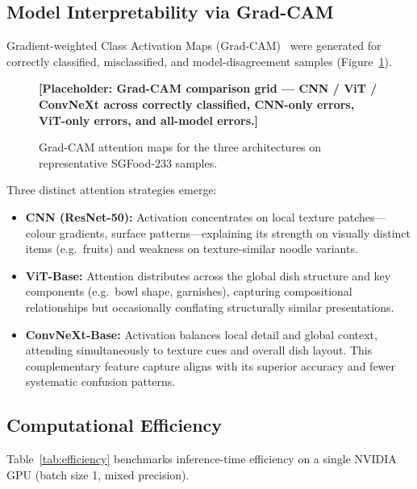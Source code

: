 \subsection{Model Interpretability via Grad-CAM}\label{sec:gradcam}

Gradient-weighted Class Activation Maps (Grad-CAM)~\cite{selvaraju2017grad}
were generated for correctly classified, misclassified, and model-disagreement
samples (Figure~\ref{fig:gradcam}).

\begin{figure}[ht]
\centering
\textbf{[Placeholder: Grad-CAM comparison grid --- CNN / ViT / ConvNeXt
across correctly classified, CNN-only errors, ViT-only errors, and
all-model errors.]}
\caption{Grad-CAM attention maps for the three architectures on
         representative SGFood-233 samples.}
\label{fig:gradcam}
\end{figure}

Three distinct attention strategies emerge:
\begin{itemize}
  \item \textbf{CNN (ResNet-50):} Activation concentrates on local
    texture patches---colour gradients, surface patterns---explaining
    its strength on visually distinct items (e.g.\ fruits) and weakness
    on texture-similar noodle variants.
  \item \textbf{ViT-Base:} Attention distributes across the global dish
    structure and key components (e.g.\ bowl shape, garnishes),
    capturing compositional relationships but occasionally conflating
    structurally similar presentations.
  \item \textbf{ConvNeXt-Base:} Activation balances local detail and
    global context, attending simultaneously to texture cues and overall
    dish layout.  This complementary feature capture aligns with its
    superior accuracy and fewer systematic confusion patterns.
\end{itemize}

\subsection{Computational Efficiency}\label{sec:efficiency}

Table~\ref{tab:efficiency} benchmarks inference-time efficiency on a
single NVIDIA GPU (batch size 1, mixed precision).

